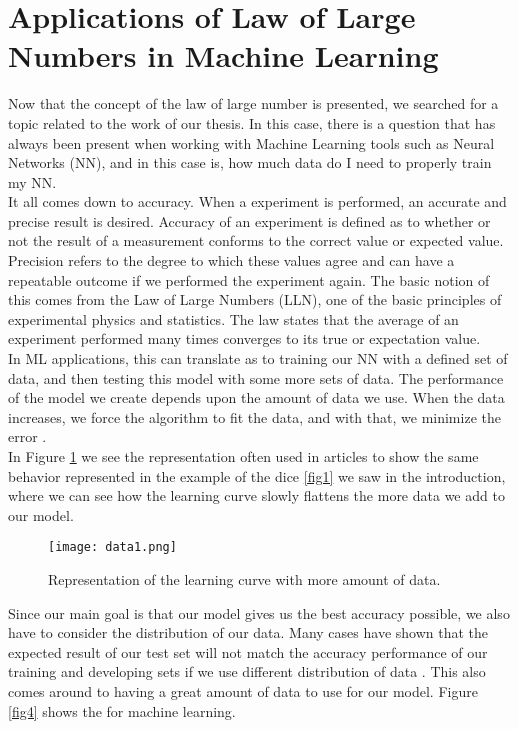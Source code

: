 \documentclass{article}
\begin{document}
\section{Applications of Law of Large Numbers in Machine Learning}

Now that the concept of the law of large number is presented, we searched for a topic related to the work of our thesis. In this case, there is a question that has always been present when working with Machine Learning tools such as Neural Networks (NN), and in this case is, how much data do I need to properly train my NN.\\

It all comes down to accuracy. When a experiment is performed, an accurate and precise result is desired. Accuracy of an experiment is defined as to whether or not the result of a measurement conforms to the correct value or expected value. Precision refers to the degree to which these values agree and can have a repeatable outcome if we performed the experiment again. The basic notion of this comes from the Law of Large Numbers (LLN), one of the basic principles of experimental physics and statistics. The law states that the average of an experiment performed many times converges to its true or expectation value.\\

In ML applications, this can translate as to training our NN with a defined set of data, and then testing this model with some more sets of data. The performance of the model we create depends upon the amount of data we use. When the data increases, we force the algorithm to fit the data, and with that, we minimize the error \cite{bot}. \\

In Figure \ref{fig3} we see the representation often used in articles to show the same behavior represented in the example of the dice \ref{fig1} we saw in the introduction, where we can see how the learning curve slowly flattens the more data we add to our model.\\

\begin{figure}[]
  \centering
  \texttt{[image: data1.png]}  
	\caption{Representation of the learning curve with more amount of data.}
\label{fig3}
\end{figure}


Since our main goal is that our model gives us the best accuracy possible, we also have to consider the distribution of our data. Many cases have shown that the expected result of our test set will not match the accuracy performance of our training and developing sets if we use different distribution of data \cite{ng2017machine}. This also comes around to having a great amount of data to use for our model. Figure \ref{fig4} shows the  for machine learning. \\
\end{document}
